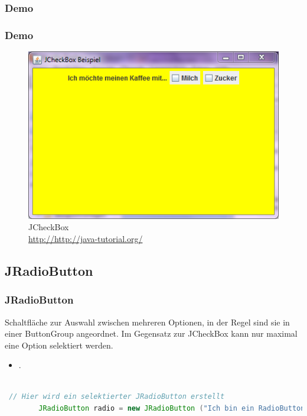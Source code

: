 \documentclass[xcolor=dvipsnames]{beamer}
\begin{document}
\subsubsection{Demo}
\begin{frame}
  \frametitle{Demo}
	\begin{figure}
		\includegraphics[scale=0.8]{images/jcheckbox.PNG}
		\caption{JCheckBox \\ \tiny{\textcolor{gray}{\url{http://http://java-tutorial.org/}}}}
		\end{figure}
\end{frame}


\subsection{JRadioButton}
\begin{frame}  %
  \frametitle{JRadioButton} %
  \begin{block}{Schaltfläche zur Auswahl zwischen mehreren Optionen, in der Regel sind sie in einer ButtonGroup angeordnet. Im Gegensatz zur JCheckBox kann nur maximal eine Option selektiert werden.}
	  \begin{itemize}
		\item .
	  \end{itemize}
  \end{block}

\begin{lstlisting}[language=java,basicstyle=\scriptsize\ttfamily]

 // Hier wird ein selektierter JRadioButton erstellt
        JRadioButton radio = new JRadioButton ("Ich bin ein RadioButton", true);

\end{lstlisting}

\end{frame}
\end{document}
